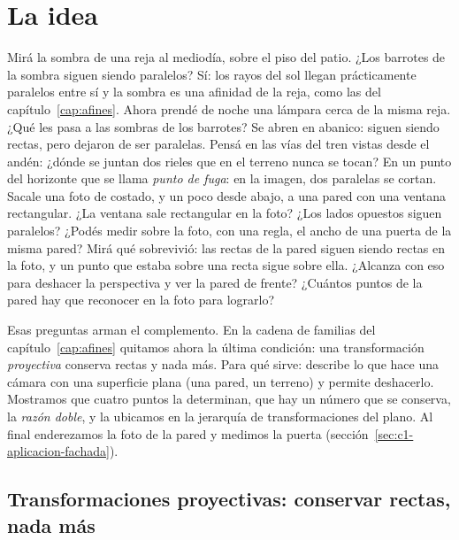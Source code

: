 \label{cap:proyectivas}\label{sec:bloque-proyectivas}


\section{La idea}

Mirá la sombra de una reja al mediodía, sobre el piso del patio. ¿Los barrotes de la sombra
siguen siendo paralelos? Sí: los rayos del sol llegan prácticamente paralelos entre sí y la
sombra es una afinidad de la reja, como las del capítulo~\ref{cap:afines}.
Ahora prendé de noche una lámpara cerca de la misma reja. ¿Qué les pasa a las sombras de los
barrotes? Se abren en abanico: siguen siendo rectas, pero dejaron de ser paralelas.
Pensá en las vías del tren vistas desde el andén: ¿dónde se juntan dos rieles que en el
terreno nunca se tocan? En un punto del horizonte que se llama \emph{punto de fuga}: en la
imagen, dos paralelas se cortan.
Sacale una foto de costado, y un poco desde abajo, a una pared con una ventana rectangular.
¿La ventana sale rectangular en la foto? ¿Los lados opuestos siguen paralelos?
¿Podés medir sobre la foto, con una regla, el ancho de una puerta de la misma pared?
Mirá qué sobrevivió: las rectas de la pared siguen siendo rectas en la foto, y un punto que
estaba sobre una recta sigue sobre ella.
¿Alcanza con eso para deshacer la perspectiva y ver la pared de frente? ¿Cuántos puntos de la
pared hay que reconocer en la foto para lograrlo?

Esas preguntas arman el complemento. En la cadena de familias del
capítulo~\ref{cap:afines} quitamos ahora la última condición: una transformación
\emph{proyectiva} conserva rectas y nada más. Para qué sirve: describe lo que hace una cámara
con una superficie plana (una pared, un terreno) y permite deshacerlo. Mostramos que cuatro
puntos la determinan, que hay un número que se conserva, la \emph{razón doble}, y la ubicamos
en la jerarquía de transformaciones del plano. Al final enderezamos la foto de la pared y
medimos la puerta (sección~\ref{sec:c1-aplicacion-fachada}).

\subsection{Transformaciones proyectivas: conservar rectas, nada más}\label{sec:proyectivas-primera}

